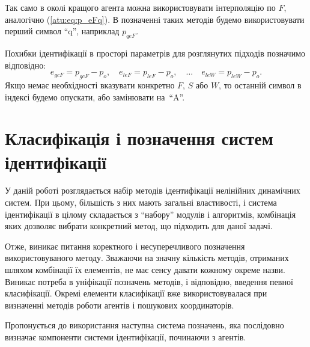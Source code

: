 Так само в околі кращого агента можна використовувати інтерполяцію по
$F$, аналогічно (\ref{atu:eq:p_eFq}). В позначенні таких методів будемо
використовувати перший символ ``q'', наприклад $p_{qeF}$.


Похибки ідентифікації в просторі параметрів для розглянутих підходів позначимо відповідно:
%
\begin{equation}
  e_{gcF} = p_{gcF} - p_o,
  \quad
  e_{leF} = p_{leF} - p_o,
  \quad
  \ldots
  \quad
  e_{leW} = p_{leW} - p_o.
  \label{atu:eq:e_xx}
\end{equation}
%
Якщо немає необхідності вказувати конкретно
$ F $,
$ S $ або
$ W $, то останній символ в індексі будемо опускати, або замінювати на~``A''.







\section{Класифікація і позначення систем ідентифікації}%
\label{atu:id_classification}

У даній роботі розглядається набір методів ідентифікації нелінійних динамічних
систем. При цьому, більшість з них мають загальні властивості, і система
ідентифікації в цілому складається з ``набору'' модулів і алгоритмів,
комбінація яких дозволяє вибрати конкретний метод, що підходить для даної
задачі.

Отже, виникає питання коректного і несуперечливого позначення
використовуваного методу. Зважаючи на значну кількість методів,
отриманих шляхом комбінації їх елементів, не має сенсу давати
кожному окреме назви. Виникає потреба в уніфікації позначень
методів, і відповідно, введення певної класифікації. Окремі елементи
класифікації вже використовувалася при визначенні методів
роботи агентів і пошукових координаторів.

Пропонується до використання наступна система позначень, яка послідовно визначає
компоненти системи ідентифікації, починаючи з агентів.

